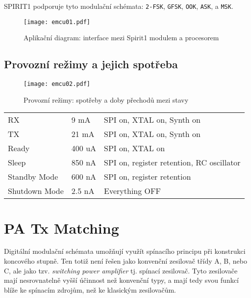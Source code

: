     SPIRIT1 podporuje tyto modulační schémata: \texttt{2-FSK}, \texttt{GFSK}, \texttt{OOK}, 
    \texttt{ASK}, a \texttt{MSK}. 

    \begin{figure}[ht!]  %
      \centering
      \texttt{[image: emcu01.pdf]}
      \caption{Aplikační diagram: interface mezi Spirit1 modulem a procesorem}
      \label{EXP001:fig_spirit22}
    \end{figure}   

    \subsection{Provozní režimy a jejich spotřeba}
      \begin{figure}[ht!]  %
        \centering
        \texttt{[image: emcu02.pdf]}
        \caption{Provozní režimy: spotřeby a doby přechodů mezi stavy}
        \label{EXP001:fig_spirit23}
      \end{figure}    

      \begin{table}[ht!]
        \begin{tabular}{lll}
          RX            & 9 mA   & SPI on, XTAL on, Synth on                 \\
          TX            & 21 mA  & SPI on, XTAL on, Synth on                 \\
          Ready         & 400 uA & SPI on, XTAL on                           \\
          Sleep         & 850 nA & SPI on, register retention, RC oscillator \\
          Standby Mode  & 600 nA & SPI on, register retention                \\
          Shutdown Mode & 2.5 nA & Everything OFF                           
          \end{tabular}
      \end{table}


  \section{PA Tx Matching}
    Digitální modulační schémata umožňují využít spínacího principu při konstrukci koncového 
    stupně. Ten totiž není řešen jako konvenční zesilovač třídy A, B, nebo C, ale jako tzv.  
    \emph{switching power amplifier} tj. spínací zesilovač. Tyto zesilovače mají nesrovnatelně 
    vyšší účinnost než konvenční typy, a mají tedy svou funkcí blíže ke spínacím zdrojům, než ke 
    klasickým zesilovačům.   
    
